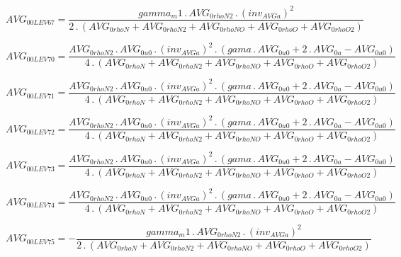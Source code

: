 \documentclass{article}
\begin{document}
\begin{dmath}AVG_{0 0 LEV 67} = \frac{gamma_m1 \,.\, AVG_{0 rhoN2} \,.\, \left(inv_{AVG a} \right)^{2}}{2 \,.\, \left(AVG_{0 rhoN} + AVG_{0 rhoN2} + AVG_{0 rhoNO} + AVG_{0 rhoO} + AVG_{0 rhoO2}\right)}\end{dmath}

\begin{dmath}AVG_{0 0 LEV 70} = \frac{AVG_{0 rhoN2} \,.\, AVG_{0 u0} \,.\, \left(inv_{AVG a} \right)^{2} \,.\, \left(gama \,.\, AVG_{0 u0} + 2 \,.\, AVG_{0 a} - AVG_{0 u0}\right)}{4 \,.\, \left(AVG_{0 rhoN} + AVG_{0 rhoN2} + AVG_{0 rhoNO} + AVG_{0 
rhoO} + AVG_{0 rhoO2}\right)}\end{dmath}

\begin{dmath}AVG_{0 0 LEV 71} = \frac{AVG_{0 rhoN2} \,.\, AVG_{0 u0} \,.\, \left(inv_{AVG a} \right)^{2} \,.\, \left(gama \,.\, AVG_{0 u0} + 2 \,.\, AVG_{0 a} - AVG_{0 u0}\right)}{4 \,.\, \left(AVG_{0 rhoN} + AVG_{0 rhoN2} + AVG_{0 rhoNO} + AVG_{0 
rhoO} + AVG_{0 rhoO2}\right)}\end{dmath}

\begin{dmath}AVG_{0 0 LEV 72} = \frac{AVG_{0 rhoN2} \,.\, AVG_{0 u0} \,.\, \left(inv_{AVG a} \right)^{2} \,.\, \left(gama \,.\, AVG_{0 u0} + 2 \,.\, AVG_{0 a} - AVG_{0 u0}\right)}{4 \,.\, \left(AVG_{0 rhoN} + AVG_{0 rhoN2} + AVG_{0 rhoNO} + AVG_{0 
rhoO} + AVG_{0 rhoO2}\right)}\end{dmath}

\begin{dmath}AVG_{0 0 LEV 73} = \frac{AVG_{0 rhoN2} \,.\, AVG_{0 u0} \,.\, \left(inv_{AVG a} \right)^{2} \,.\, \left(gama \,.\, AVG_{0 u0} + 2 \,.\, AVG_{0 a} - AVG_{0 u0}\right)}{4 \,.\, \left(AVG_{0 rhoN} + AVG_{0 rhoN2} + AVG_{0 rhoNO} + AVG_{0 
rhoO} + AVG_{0 rhoO2}\right)}\end{dmath}

\begin{dmath}AVG_{0 0 LEV 74} = \frac{AVG_{0 rhoN2} \,.\, AVG_{0 u0} \,.\, \left(inv_{AVG a} \right)^{2} \,.\, \left(gama \,.\, AVG_{0 u0} + 2 \,.\, AVG_{0 a} - AVG_{0 u0}\right)}{4 \,.\, \left(AVG_{0 rhoN} + AVG_{0 rhoN2} + AVG_{0 rhoNO} + AVG_{0 
rhoO} + AVG_{0 rhoO2}\right)}\end{dmath}

\begin{dmath}AVG_{0 0 LEV 75} = - \frac{gamma_m1 \,.\, AVG_{0 rhoN2} \,.\, \left(inv_{AVG a} \right)^{2}}{2 \,.\, \left(AVG_{0 rhoN} + AVG_{0 rhoN2} + AVG_{0 rhoNO} + AVG_{0 rhoO} + AVG_{0 rhoO2}\right)}\end{dmath}
\end{document}
